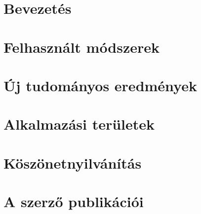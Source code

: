 \documentclass[twoside]{article}
\begin{document}


\section{Bevezetés}

 
\pagebreak
\section{Felhasznált módszerek}


\pagebreak
\section{Új tudományos eredmények}


\pagebreak
\section{Alkalmazási területek}


 \pagebreak
\section{Köszönetnyilvánítás}


\cleardoublepage
\section{A szerző publikációi}

\end{document}
